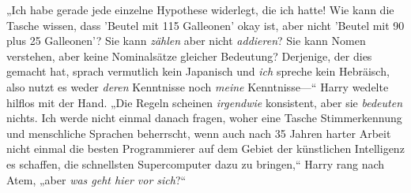 „Ich habe gerade jede einzelne Hypothese widerlegt, die ich hatte! Wie kann die Tasche wissen, dass 'Beutel mit 115 Galleonen' okay ist, aber nicht 'Beutel mit 90 plus 25 Galleonen'? Sie kann \emph{zählen} aber nicht \emph{addieren}? Sie kann Nomen verstehen, aber keine Nominalsätze gleicher Bedeutung? Derjenige, der dies gemacht hat, sprach vermutlich kein Japanisch und \emph{ich} spreche kein Hebräisch, also nutzt es weder \emph{deren} Kenntnisse noch \emph{meine} Kenntnisse—“ Harry wedelte hilflos mit der Hand. „Die Regeln scheinen \emph{irgendwie} konsistent, aber sie \emph{bedeuten} nichts. Ich werde nicht einmal danach fragen, woher eine Tasche Stimmerkennung und menschliche Sprachen beherrscht, wenn auch nach 35 Jahren harter Arbeit nicht einmal die besten Programmierer auf dem Gebiet der künstlichen Intelligenz es schaffen, die schnellsten Supercomputer dazu zu bringen,“ Harry rang nach Atem, „aber \emph{was geht hier vor sich}?“

